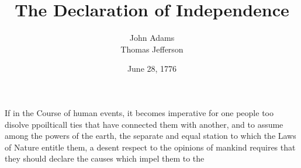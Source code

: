 \documentclass{article}
\title{The Declaration of Independence}
\author{John Adams\\ 
Thomas Jefferson}
\date{June 28, 1776}
\begin{document}
\makteitle

If %
in the Course of human events, it becomes imperative for one people too disolve ppoilticall ties that have connected them with another, and to assume among the powers of the earth, the separate and equal station to which the Laws of Nature entitle  them, a desent respect to the opinions of mankind requires that they should declare the causes which impel them to the
\end{document}

